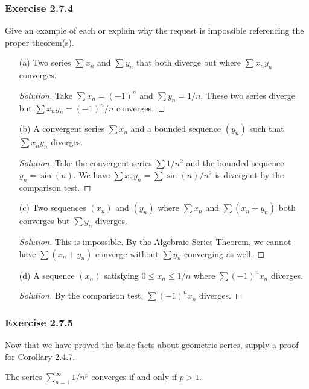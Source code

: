 \subsubsection{Exercise 2.7.4} Give an example of each or explain why the request is impossible referencing the proper theorem(s).
\begin{enumerate}
    \item[(a)] Two series \( \sum x_n \) and \( \sum y_n \) that both diverge but where \(\sum x_ny_n \) converges.
        \begin{proof}[Solution]
        Take \(\sum x_n = (-1)^n\) and \( \sum y_n = 1/n\). These two series diverge but \(\sum x_n y_n = (-1)^n / n \) converges.
        \end{proof}
    \item[(b)] A convergent series \( \sum x_n \) and a bounded sequence \( (y_n)\) such that \( \sum x_n y_n \) diverges.
        \begin{proof}[Solution]
        Take the convergent series \( \sum 1 / n^2\) and the bounded sequence \( y_n = \sin(n)\). We have \( \sum x_n y_n = \sum \sin(n)/n^2\) is divergent by the comparison test.
        \end{proof}
    \item[(c)] Two sequences \( (x_n)\) and \((y_n)\) where \(\sum x_n \) and \( \sum (x_n + y_n)\) both converges but \( \sum y_n \) diverges.
        \begin{proof}[Solution]
        This is impossible. By the Algebraic Series Theorem, we cannot have \( \sum (x_n + y_n)\) converge without \( \sum y_n \) converging as well. 
        \end{proof}
    \item[(d)] A sequence \( (x_n)\) satisfying \( 0 \leq x_n \leq 1/n\) where \( \sum (-1)^n x_n\) diverges.
        \begin{proof}[Solution]
        By the comparison test, \( \sum (-1)^n x_n \) diverges.
        \end{proof}
\end{enumerate}

\subsubsection{Exercise 2.7.5} Now that we have proved the basic facts about geometric series, supply a proof for Corollary 2.4.7.

\begin{corollary}
The series \( \sum_{n=1}^{\infty} 1/n^p \) converges if and only if \( p > 1 \).
\end{corollary}


